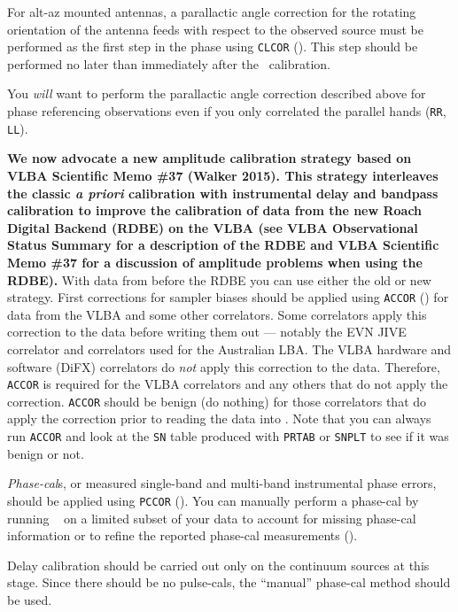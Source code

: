 For alt-az mounted antennas, a parallactic angle correction for the
rotating orientation of the antenna feeds with respect to the observed
source must be performed as the first step in the phase
 using {\tt CLCOR} ().
This step should be performed no later than immediately after the
\Tsys\ calibration.

You {\it will} want to perform the parallactic angle correction
described above for phase referencing observations even if you only
correlated the parallel hands ({\tt RR}, {\tt LL}).

{\bf We now advocate a new amplitude calibration strategy based on VLBA Scientific
Memo \#37 (Walker 2015).  This strategy interleaves the classic {\it a priori}
calibration with instrumental delay and bandpass calibration to improve
the calibration of data from the new Roach Digital Backend (RDBE) on the VLBA
(see VLBA Observational Status
Summary for a description of the RDBE and VLBA Scientific Memo \#37 for a
discussion of  amplitude problems when using the RDBE).}  With data from before
the RDBE you can use either the old or new strategy.
First corrections for sampler biases should be applied using {\tt ACCOR}
() for data from the VLBA and some other correlators.
Some correlators apply this correction to the data before writing them
out --- notably the EVN JIVE correlator and correlators used for the
Australian LBA.  The VLBA hardware and software (DiFX) correlators do
{\it not} apply this correction to the data.  Therefore, {\tt ACCOR}
is required for the VLBA correlators and any others that do not apply
the correction.  {\tt ACCOR} should be benign (do nothing) for those
correlators that do apply the correction prior to reading the data
into \AIPS\@.  Note that you can always run {\tt ACCOR} and look at
the {\tt SN} table produced with {\tt PRTAB} or {\tt SNPLT} to see if
it was benign or not.

{\it Phase-cal\/}s, or measured single-band and multi-band
instrumental phase errors, should be applied using {\tt PCCOR}
().  You can manually perform a phase-cal by running {\tt
{}} on a limited subset of your data to account for missing
phase-cal information or to refine the reported phase-cal measurements
().

Delay calibration should be carried out only on the continuum sources
at this stage.  Since there should be no pulse-cals, the ``manual''
phase-cal method should be used.

